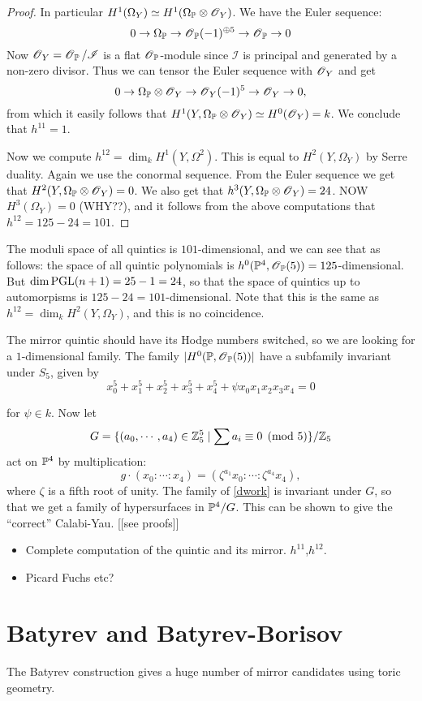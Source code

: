 \documentclass[11pt, english]{article}
\begin{document}
\begin{proof}
In particular $H^1(\Omega_Y) \simeq H^1(\Omega_{\mathbb{P}} \otimes \operatorname{\mathscr{O}}_Y)$. We have the Euler sequence:
$$
0 \to \Omega_{\mathbb{P}} \to \operatorname{\mathscr{O}}_{\mathbb{P}}(-1)^{\oplus 5} \to \operatorname{\mathscr{O}}_{\mathbb{P}} \to 0
$$
Now $\operatorname{\mathscr{O}}_Y=\operatorname{\mathscr{O}}_{\mathbb{P}}/\mathscr I$ is a flat $\operatorname{\mathscr{O}}_{\mathbb{P}}$-module since $\mathscr I$ is principal and generated by a non-zero divisor. Thus we can tensor the Euler sequence with $\operatorname{\mathscr{O}}_Y$ and get
$$
0 \to \Omega_{\mathbb{P}} \otimes \operatorname{\mathscr{O}}_Y \to \operatorname{\mathscr{O}}_Y(-1)^5 \to \operatorname{\mathscr{O}}_Y \to 0,
$$
from which it easily follows that $H^1(Y,\Omega_{\mathbb{P}} \otimes \operatorname{\mathscr{O}}_Y) \simeq H^0(\operatorname{\mathscr{O}}_Y) = k$. We conclude that $h^{11}=1$. 

Now we compute $h^{12} = \dim_k H^1(Y,\Omega^2)$. This is equal to $H^2(Y, \Omega_Y)$ by Serre duality. Again we use the conormal sequence. From the Euler sequence we get that $H^2(Y, \Omega_{\mathbb{P}} \otimes \operatorname{\mathscr{O}}_Y)=0$. We also get that $h^3(Y,\Omega_{\mathbb{P}} \otimes \operatorname{\mathscr{O}}_Y)=24$. NOW $H^3(\Omega_Y)=0$ (WHY??), and it follows from the above computations that $h^{12}=125-24=101$.
\end{proof}

The moduli space of all quintics is $101$-dimensional, and we can see that as follows: the space of all quintic polynomials is $h^0(\mathbb{P}^4,\operatorname{\mathscr{O}}_{\mathbb{P}}(5))=125$-dimensional. But $\dim \operatorname{PGL}(n+1)=25-1=24$, so that the space of quintics up to automorpisms is $125-24=101$-dimensional. Note that this is the same as $h^{12}=\dim_k H^2(Y,\Omega_Y)$, and this is no coincidence.

The mirror quintic should have its Hodge numbers switched, so we are looking for a $1$-dimensional family. The family $\lvert H^0(\mathbb{P},\operatorname{\mathscr{O}}_{\mathbb{P}}(5)) \rvert$ have a subfamily invariant under $S_5$, given by
\begin{equation}
\label{dwork}
x_0^5+x_1^5+x_2^5+x_3^5+x_4^5 + \psi x_0x_1x_2x_3x_4=0  
\end{equation}

for $\psi \in k$. Now let
$$
G = \{ (a_0,\cdots, a_4) \in \mathbb{Z}_5^5 \mid \sum a_i \equiv 0 \pmod 5 \} / \mathbb{Z}_5
$$
act on $\mathbb{P}^4$ by multiplication:
$$
g \cdot (x_0:\cdots:x_4) = (\zeta^{a_1}x_0:\cdots : \zeta^{a_4}x_4),
$$
where $\zeta$ is a fifth root of unity. The family of \eqref{dwork} is invariant under $G$, so that we get a family of hypersurfaces in $\mathbb{P}^4/G$. This can be shown to give the ``correct'' Calabi-Yau. [[see proofs]]

\begin{itemize}
\item Complete computation of the quintic and its mirror. $h^{11}$,$h^{12}$. 
\item Picard Fuchs etc?
\end{itemize}


\section{Batyrev and Batyrev-Borisov}

The Batyrev construction gives a huge number of mirror candidates using toric geometry. 
\end{document}
